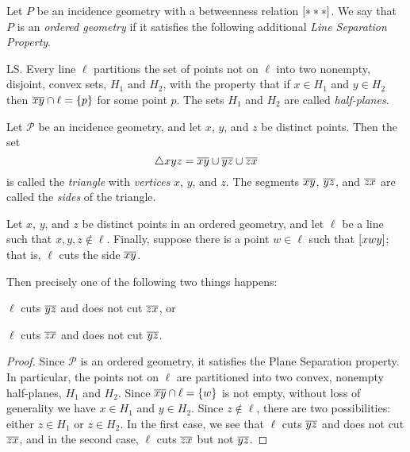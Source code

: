 \begin{dfn}
Let $P$ be an incidence geometry with a betweenness relation $[ \ast \ast \ast ]$. We say that $P$ is an \emph{ordered geometry} if it satisfies the following additional \emph{Line Separation Property}.
\begin{proplist}
\item[LS.] Every line $\ell$ partitions the set of points not on $\ell$ into two nonempty, disjoint, convex sets, $H_1$ and $H_2$, with the property that if $x \in H_1$ and $y \in H_2$ then $\overline{xy} \cap \ell = \{p\}$ for some point $p$. The sets $H_1$ and $H_2$ are called \emph{half-planes}.
\end{proplist}
\end{dfn}

\begin{dfn}[Triangle]
Let $\mathcal{P}$ be an incidence geometry, and let $x$, $y$, and $z$ be distinct points. Then the set \[ \bigtriangleup{xyz} = \overline{xy} \cup \overline{yz} \cup \overline{zx} \] is called the \emph{triangle} with \emph{vertices} $x$, $y$, and $z$. The segments $\overline{xy}$, $\overline{yz}$, and $\overline{zx}$ are called the \emph{sides} of the triangle.
\end{dfn}

\begin{prop}
Let $x$, $y$, and $z$ be distinct points in an ordered geometry, and let $\ell$ be a line such that $x,y,z \notin \ell$. Finally, suppose there is a point $w \in \ell$ such that $[ x w y ]$; that is, $\ell$ cuts the side $\overline{xy}$.

Then precisely one of the following two things happens:
\begin{proplist}
\item $\ell$ cuts $\overline{yz}$ and does not cut $\overline{zx}$, or
\item $\ell$ cuts $\overline{zx}$ and does not cut $\overline{yz}$.
\end{proplist}
\end{prop}

\begin{proof}
Since $\mathcal{P}$ is an ordered geometry, it satisfies the Plane Separation property. In particular, the points not on $\ell$ are partitioned into two convex, nonempty half-planes, $H_1$ and $H_2$. Since $\overline{xy} \cap \ell = \{w\}$ is not empty, without loss of generality we have $x \in H_1$ and $y \in H_2$. Since $z \notin \ell$, there are two possibilities: either $z \in H_1$ or $z \in H_2$. In the first case, we see that $\ell$ cuts $\overline{yz}$ and does not cut $\overline{zx}$, and in the second case, $\ell$ cuts $\overline{zx}$ but not $\overline{yz}$.
\end{proof}

